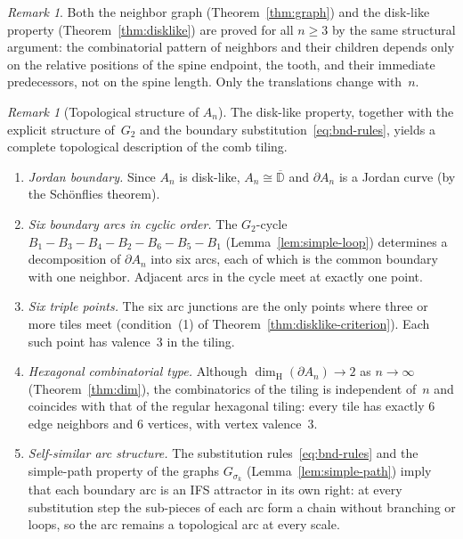 \documentclass{amsart}
\theoremstyle{definition}
\theoremstyle{remark}
\newtheorem{remark}[theorem]{Remark}
\newcommand{\dH}{\dim_{\mathrm{H}}}
\begin{document}
\begin{remark}
Both the neighbor graph (Theorem~\ref{thm:graph}) and the disk-like
property (Theorem~\ref{thm:disklike}) are proved for all $n \ge 3$ by
the same structural argument: the combinatorial pattern of neighbors
and their children depends only on the relative positions of the
spine endpoint, the tooth, and their immediate predecessors,
not on the spine length.  Only the translations change with~$n$.
\end{remark}

\begin{remark}[Topological structure of $A_n$]
\label{rem:topology}
The disk-like property, together with the explicit structure of~$G_2$
and the boundary substitution~\eqref{eq:bnd-rules}, yields a
complete topological description of the comb tiling.

\begin{enumerate}
\item \emph{Jordan boundary.}
Since $A_n$ is disk-like, $A_n \cong \overline{\mathbb{D}}$ and
$\partial A_n$ is a Jordan curve (by the Sch\"onflies theorem).

\item \emph{Six boundary arcs in cyclic order.}
The $G_2$-cycle
$B_1 \!-\! B_3 \!-\! B_4 \!-\! B_2 \!-\! B_6 \!-\! B_5 \!-\! B_1$
(Lemma~\ref{lem:simple-loop}) determines a decomposition of
$\partial A_n$ into six arcs, each of which is the common boundary
with one neighbor.  Adjacent arcs in the cycle meet at exactly one
point.

\item \emph{Six triple points.}
The six arc junctions are the only points where three or more tiles
meet (condition~(1) of Theorem~\ref{thm:disklike-criterion}).
Each such point has valence~$3$ in the tiling.

\item \emph{Hexagonal combinatorial type.}
Although $\dH(\partial A_n) \to 2$ as $n \to \infty$
(Theorem~\ref{thm:dim}), the combinatorics of the tiling is
independent of~$n$ and coincides with that of the regular hexagonal
tiling: every tile has exactly $6$ edge neighbors and $6$ vertices,
with vertex valence~$3$.

\item \emph{Self-similar arc structure.}
The substitution rules~\eqref{eq:bnd-rules} and the simple-path
property of the graphs $G_{\sigma_k}$
(Lemma~\ref{lem:simple-path}) imply that each boundary arc is an
IFS attractor in its own right: at every substitution step the
sub-pieces of each arc form a chain without branching or loops,
so the arc remains a topological arc at every scale.
\end{enumerate}
\end{remark}
\end{document}
